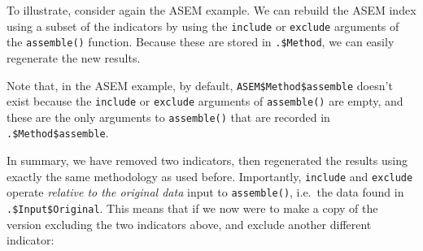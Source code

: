 \documentclass[
]{book}
\newenvironment{Shaded}{\begin{snugshade}}{\end{snugshade}}
\newcommand{\AttributeTok}[1]{\textcolor[rgb]{0.77,0.63,0.00}{#1}}
\newcommand{\CommentTok}[1]{\textcolor[rgb]{0.56,0.35,0.01}{\textit{#1}}}
\newcommand{\ConstantTok}[1]{\textcolor[rgb]{0.00,0.00,0.00}{#1}}
\newcommand{\FunctionTok}[1]{\textcolor[rgb]{0.00,0.00,0.00}{#1}}
\newcommand{\NormalTok}[1]{#1}
\newcommand{\OtherTok}[1]{\textcolor[rgb]{0.56,0.35,0.01}{#1}}
\newcommand{\SpecialCharTok}[1]{\textcolor[rgb]{0.00,0.00,0.00}{#1}}
\newcommand{\StringTok}[1]{\textcolor[rgb]{0.31,0.60,0.02}{#1}}
\begin{document}
To illustrate, consider again the ASEM example. We can rebuild the ASEM index using a subset of the indicators by using the \texttt{include} or \texttt{exclude} arguments of the \texttt{assemble()} function. Because these are stored in \texttt{.\$Method}, we can easily regenerate the new results.

\begin{Shaded}
\end{Shaded}

Note that, in the ASEM example, by default, \texttt{ASEM\$Method\$assemble} doesn't exist because the \texttt{include} or \texttt{exclude} arguments of \texttt{assemble()} are empty, and these are the only arguments to \texttt{assemble()} that are recorded in \texttt{.\$Method\$assemble}.

In summary, we have removed two indicators, then regenerated the results using exactly the same methodology as used before. Importantly, \texttt{include} and \texttt{exclude} operate \emph{relative to the original data} input to \texttt{assemble()}, i.e.~the data found in \texttt{.\$Input\$Original}. This means that if we now were to make a copy of the version excluding the two indicators above, and exclude another different indicator:
\end{document}
